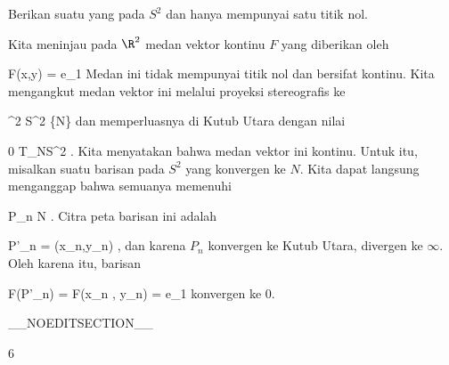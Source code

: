 {

Berikan suatu
 yang
pada $S^2$ dan hanya mempunyai satu titik nol.

}
{

Kita meninjau pada $\R^2$ medan vektor kontinu $F$ yang diberikan oleh

\mavergleichskettedisp
{\vergleichskette
{F(x,y)
}
{ =} { {  }  e_1
}
{ } {
}
{ } {
}
{ } {
}
}
{}{}{}
Medan ini tidak mempunyai titik nol dan bersifat kontinu. Kita mengangkut medan vektor ini melalui proyeksi stereografis ke

\mavergleichskette
{\vergleichskette
{  \R^2
}
{ \cong }{ S^2 \setminus \{N\}
}
{  }{
}
{    }{
}
{   }{
}
}
{}{}{}
dan memperluasnya di Kutub Utara dengan nilai

\mavergleichskette
{\vergleichskette
{ 0
}
{ \in }{  T_NS^2
}
{  }{
}
{    }{
}
{   }{
}
}
{}{}{.}
Kita menyatakan bahwa medan vektor ini kontinu. Untuk itu, misalkan
 suatu barisan pada $S^2$ yang konvergen ke $N$. Kita dapat langsung menganggap bahwa semuanya memenuhi

\mavergleichskette
{\vergleichskette
{P_n
}
{ \neq }{N
}
{  }{
}
{    }{
}
{   }{
}
}
{}{}{}
. Citra peta barisan ini adalah

\mavergleichskettedisp
{\vergleichskette
{P'_n
}
{ =} { (x_n,y_n)
}
{ } {
}
{ } {
}
{ } {
}
}
{}{}{,}
dan karena $P_n$ konvergen ke Kutub Utara,
 divergen ke $\infty$. Oleh karena itu, barisan

\mavergleichskettedisp
{\vergleichskette
{ F(P'_n)
}
{ =} { F(x_n , y_n)
}
{ =} { {  } e_1
}
{ } {
}
{ } {
}
}
{}{}{}
konvergen ke $0$.

 }

__NOEDITSECTION__

{6}

